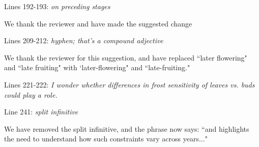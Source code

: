 \documentclass[10.95pt,a4paper]{letter}
\begin{document}
\par Lines 192-193: \emph{on preceding stages}
\par We thank the reviewer and have made the suggested change
 
\par Lines 209-212: \emph{hyphen; that's a compound adjective}
\par We thank the reviewer for this suggestion, and have replaced ``later flowering" and ``late fruiting" with `later-flowering" and ``late-fruiting." 

\par Lines 221-222: \emph{I wonder whether differences in frost sensitivity of leaves vs. buds could play a role. }

\par Line 241: \emph{split infinitive}
\par We have removed the split infinitive, and the phrase now says: ``and highlights the need to understand how such constraints vary across years..."
\end{document}
